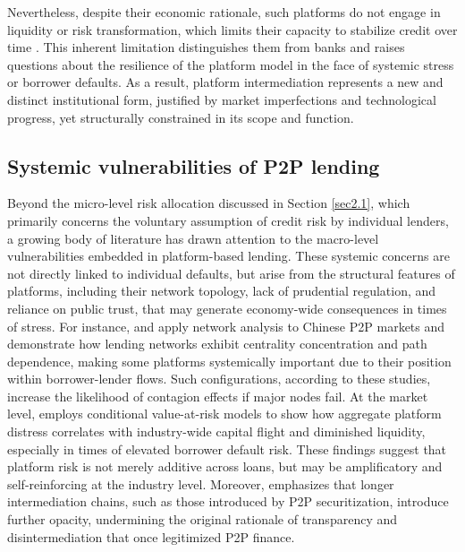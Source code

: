 \documentclass[pdflatex,sn-apa]{sn-jnl}%
\theoremstyle{thmstyleone}%
\theoremstyle{thmstyletwo}%
\theoremstyle{thmstylethree}%
\begin{document}
Nevertheless, despite their economic rationale, such platforms do not engage in liquidity or risk transformation, which limits their capacity to stabilize credit over time \citep{Havrylchyk2018115}. This inherent limitation distinguishes them from banks and raises questions about the resilience of the platform model in the face of systemic stress or borrower defaults. As a result, platform intermediation represents a new and distinct institutional form, justified by market imperfections and technological progress, yet structurally constrained in its scope and function.

\subsection{Systemic vulnerabilities of P2P lending}
Beyond the micro-level risk allocation discussed in Section \ref{sec2.1}, which primarily concerns the voluntary assumption of credit risk by individual lenders, a growing body of literature has drawn attention to the macro-level vulnerabilities embedded in platform-based lending. These systemic concerns are not directly linked to individual defaults, but arise from the structural features of platforms, including their network topology, lack of prudential regulation, and reliance on public trust, that may generate economy-wide consequences in times of stress. For instance, \citet{Li2018118} and \citet{Lu2018} apply network analysis to Chinese P2P markets and demonstrate how lending networks exhibit centrality concentration and path dependence, making some platforms systemically important due to their position within borrower-lender flows. Such configurations, according to these studies, increase the likelihood of contagion effects if major nodes fail. At the market level, \citet{Li20222596} employs conditional value-at-risk models to show how aggregate platform distress correlates with industry-wide capital flight and diminished liquidity, especially in times of elevated borrower default risk. These findings suggest that platform risk is not merely additive across loans, but may be amplificatory and self-reinforcing at the industry level. Moreover, \citet{Bavoso2020395} emphasizes that longer intermediation chains, such as those introduced by P2P securitization, introduce further opacity, undermining the original rationale of transparency and disintermediation that once legitimized P2P finance. 
\end{document}

